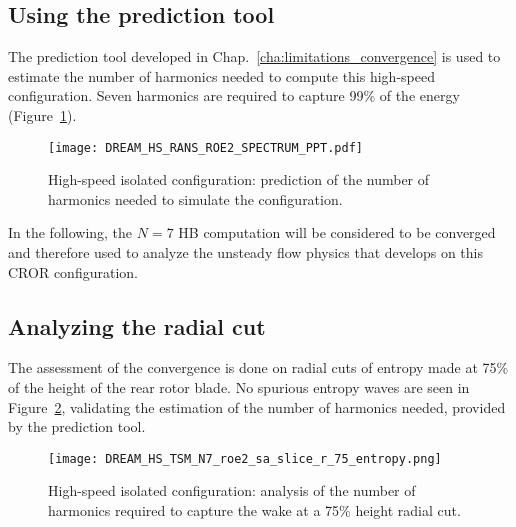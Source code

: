 
\subsection{Using the prediction tool}
\label{sub:dream_hs_conv_hb_prediction_tool}

The prediction tool developed in Chap.~\ref{cha:limitations_convergence}
is used to estimate the number of harmonics needed to compute
this high-speed configuration.
Seven harmonics are required to capture 99\% of the energy
(Figure~\ref{fig:DREAM_HS_RANS_ROE2_SPECTRUM_PPT}).
\begin{figure}[htp]
  \centering
  \texttt{[image: DREAM\_HS\_RANS\_ROE2\_SPECTRUM\_PPT.pdf]}
  \caption{High-speed isolated configuration: prediction of the number
  of harmonics needed to simulate the configuration.}
  \label{fig:DREAM_HS_RANS_ROE2_SPECTRUM_PPT}
\end{figure}

In the following, the $N=7$ HB computation will be
considered to be converged and therefore used to 
analyze the unsteady flow physics that develops on 
this CROR configuration.

\subsection{Analyzing the radial cut}
\label{sub:dream_hs_conv_hb_slice_r}

The assessment of the convergence is done on radial cuts
of entropy made at 75\% of the height of the rear rotor blade. 
No spurious entropy waves are seen
in Figure~\ref{fig:dream_hs_hb_slice_r_conv}, validating the
estimation of the number of harmonics needed, provided
by the prediction tool.
\begin{figure}[htp]
  \centering
  \texttt{[image: DREAM\_HS\_TSM\_N7\_roe2\_sa\_slice\_r\_75\_entropy.png]}
  \caption{High-speed isolated configuration: analysis of the number of harmonics
  required to capture the wake at a 75\% height radial cut.}
  \label{fig:dream_hs_hb_slice_r_conv}
\end{figure}
